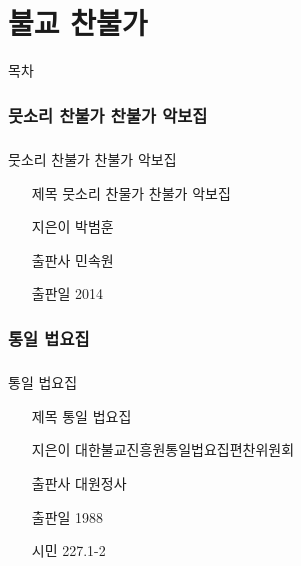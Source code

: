 \documentclass[aspectratio=1610,17pt,xcolor=pdftex,dvipsnames,table,handout]{beamer}
\begin{document}
		\part{ 불교 찬불가 }
		\frame{\partpage}

		\begin{frame} [plain]{목차}
		\tableofcontents%
		\end{frame}


		\section{ 뭇소리 찬불가 찬불가 악보집 }
		\begin{frame} [t,plain]
		\frametitle{}
			\begin{block} { 뭇소리 찬불가 찬불가 악보집 }
			\setlength{\leftmargini}{4em}			
			\begin{itemize}
				\item [제목]  	뭇소리 찬물가 찬불가 악보집 
				\item [지은이]	박범훈
				\item [출판사]	민속원
				\item [출판일]	2014
			\end{itemize}
			\end{block}						
		\end{frame}						



		\section{ 통일 법요집 }
		\begin{frame} [t,plain]
		\frametitle{}
			\begin{block} { 통일 법요집 }
			\setlength{\leftmargini}{4em}			
			\begin{itemize}
				\item [제목]  	통일 법요집
				\item [지은이]	대한불교진흥원통일법요집편찬위원회 
				\item [출판사]	대원정사
				\item [출판일]	1988
				\item [시민]		227.1-2	
			\end{itemize}
			\end{block}						
		\end{frame}						
\end{document}
